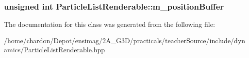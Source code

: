 \hypertarget{classParticleListRenderable_a87f491d5861bb1b9f98541e5926c4c5e}{
\subsubsection[{m\+\_\+position\+Buffer}]{\setlength{\rightskip}{0pt plus 5cm}unsigned int Particle\+List\+Renderable\+::m\+\_\+position\+Buffer\hspace{0.3cm}{\ttfamily [private]}}}\label{classParticleListRenderable_a87f491d5861bb1b9f98541e5926c4c5e}


The documentation for this class was generated from the following file\+:\begin{DoxyCompactItemize}
\item 
/home/chardon/\+Depot/ensimag/2\+A\+\_\+\+G3\+D/practicals/teacher\+Source/include/dynamics/\hyperlink{ParticleListRenderable_8hpp}{Particle\+List\+Renderable.\+hpp}\end{DoxyCompactItemize}
